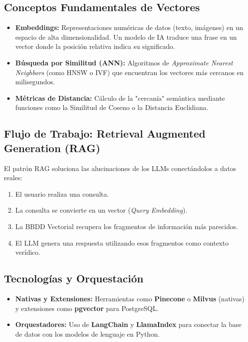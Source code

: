 \documentclass[12pt,a4paper,openany,oneside]{book}
\begin{document}
\subsection{Conceptos Fundamentales de Vectores}
\begin{itemize}
    \item \textbf{Embeddings:} Representaciones numéricas de datos (texto, imágenes) en un espacio de alta dimensionalidad. Un modelo de IA traduce una frase en un vector donde la posición relativa indica su significado.
    \item \textbf{Búsqueda por Similitud (ANN):} Algoritmos de \textit{Approximate Nearest Neighbors} (como HNSW o IVF) que encuentran los vectores más cercanos en milisegundos.
    \item \textbf{Métricas de Distancia:} Cálculo de la "cercanía" semántica mediante funciones como la Similitud de Coseno o la Distancia Euclidiana.
\end{itemize}

\subsection{Flujo de Trabajo: Retrieval Augmented Generation (RAG)}
El patrón RAG soluciona las alucinaciones de los LLMs conectándolos a datos reales:
\begin{enumerate}
    \item El usuario realiza una consulta.
    \item La consulta se convierte en un vector (\textit{Query Embedding}).
    \item La BBDD Vectorial recupera los fragmentos de información más parecidos.
    \item El LLM genera una respuesta utilizando esos fragmentos como contexto verídico.
\end{enumerate}



\subsection{Tecnologías y Orquestación}
\begin{itemize}
    \item \textbf{Nativas y Extensiones:} Herramientas como \textbf{Pinecone} o \textbf{Milvus} (nativas) y extensiones como \textbf{pgvector} para PostgreSQL.
    \item \textbf{Orquestadores:} Uso de \textbf{LangChain} y \textbf{LlamaIndex} para conectar la base de datos con los modelos de lenguaje en Python.
\end{itemize}
\end{document}

